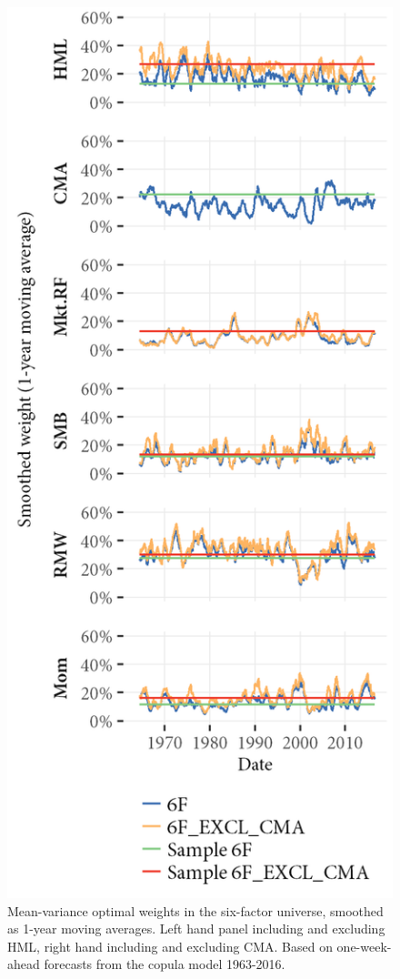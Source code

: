 \begin{figure}[htbp]
\begin{minipage}{\textwidth}
  \includegraphics[scale = 1]{graphics/Weights_6F_EXCL_CMA_6F.png} \\
  \vspace{3mm}
  \footnotesize
  Mean-variance optimal weights in the six-factor universe, smoothed as 1-year moving averages. Left hand panel including and excluding HML, right hand including and excluding CMA. Based on one-week-ahead forecasts from the copula model 1963-2016.
  \end{minipage}
\end{figure}


